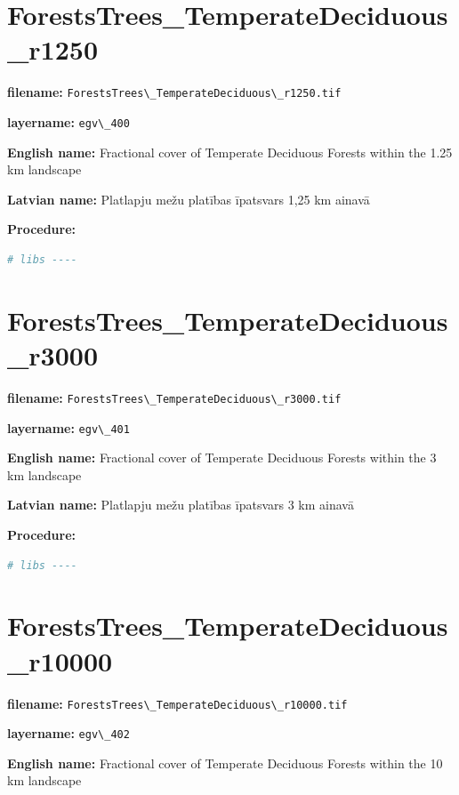 \documentclass[
]{book}
\newcommand{\passthrough}[1]{#1}
\begin{document}
\section{ForestsTrees\_TemperateDeciduous\_r1250}\label{ch06.400}

\textbf{filename:} \passthrough{\lstinline!ForestsTrees\_TemperateDeciduous\_r1250.tif!}

\textbf{layername:} \passthrough{\lstinline!egv\_400!}

\textbf{English name:} Fractional cover of Temperate Deciduous Forests within the 1.25 km landscape

\textbf{Latvian name:} Platlapju mežu platības īpatsvars 1,25 km ainavā

\textbf{Procedure:}

\begin{lstlisting}[language=R]
# libs ----
\end{lstlisting}

\section{ForestsTrees\_TemperateDeciduous\_r3000}\label{ch06.401}

\textbf{filename:} \passthrough{\lstinline!ForestsTrees\_TemperateDeciduous\_r3000.tif!}

\textbf{layername:} \passthrough{\lstinline!egv\_401!}

\textbf{English name:} Fractional cover of Temperate Deciduous Forests within the 3 km landscape

\textbf{Latvian name:} Platlapju mežu platības īpatsvars 3 km ainavā

\textbf{Procedure:}

\begin{lstlisting}[language=R]
# libs ----
\end{lstlisting}

\section{ForestsTrees\_TemperateDeciduous\_r10000}\label{ch06.402}

\textbf{filename:} \passthrough{\lstinline!ForestsTrees\_TemperateDeciduous\_r10000.tif!}

\textbf{layername:} \passthrough{\lstinline!egv\_402!}

\textbf{English name:} Fractional cover of Temperate Deciduous Forests within the 10 km landscape
\end{document}
